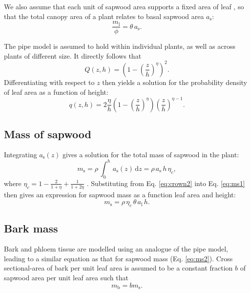 \documentclass[10pt,twoside]{article}
\begin{document}
We also assume that each unit of sapwood area supports a fixed area of
leaf \citep[the pipe model][]{Shinozaki-1964}, so that the total canopy
area of a plant relates to basal sapwood area \(a_\textrm{s}\):
\begin{equation}\label{eq:crown2}
\frac{m_\textrm{l}}{\phi}= \theta \, a_\textrm{s}.
\end{equation}

The pipe model is assumed to hold within individual plants, as well as
across plants of different size. It directly follows that
\begin{equation}\label{eq:crown1}
Q(z,h)= \left(1-\left(\frac{z}{h}\right)^\eta\right)^2.
\end{equation}
Differentiating with respect to \(z\) then yields a solution for the
probability density of leaf area as a function of height:
\begin{equation}\label{eq:crown3}
q(z,h)= 2\frac{\eta}{h}(1-\left(\frac{z}{h}\right)^{\eta}) \left(\frac{z}{h}\right)^{\eta-1}.
\end{equation}

\subsection{Mass of sapwood}\label{mass-of-sapwood}

Integrating \(a_\textrm{s}(z)\) gives a solution for the total mass of
sapwood in the plant:
\begin{equation}\label{eq:ms1}
m_\textrm{s}=\rho \, \int_0^h \, a_\textrm{s}(z) \, \textrm{d}z= \rho \, a_\textrm{s} \, h \, \eta_c, 
\end{equation}
where \(\eta_c=1-\frac{2}{1+\eta} + \frac{1}{1+2\eta}\)
\citep{Yokozawa-1995}. Substituting from Eq. \ref{eq:crown2} into Eq.
\ref{eq:ms1} then gives an expression for sapwood mass as a function
leaf area and height:
\begin{equation}\label{eq:ms2}
m_\textrm{s}=\rho \, \eta_c \, \theta \, a_\textrm{l} \, h.
\end{equation}

\subsection{Bark mass}\label{bark-mass}

Bark and phloem tissue are modelled using an analogue of the pipe model,
leading to a similar equation as that for sapwood mass (Eq.
\ref{eq:ms2}). Cross sectional-area of bark per unit leaf area is
assumed to be a constant fraction \(b\) of sapwood area per unit leaf
area such that
\begin{equation}\label{eq:mb}
m_\textrm{b}=b m_\textrm{s}.
\end{equation}
\end{document}
